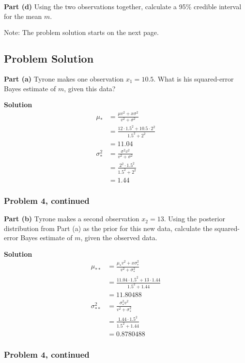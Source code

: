 \documentclass[12pt]{article}
\theoremstyle{definition}
\begin{document}
\bigskip
\noindent
{\bf Part (d)} Using the two observations together, calculate a 95\% credible interval for the mean $m$.

\bigskip
\noindent
Note: The problem solution starts on the next page.

\newpage
\subsection*{Problem Solution}

\noindent
{\bf Part (a)} Tyrone makes one observation $x_1 = 10.5$. What is his squared-error Bayes estimate of $m$, given this data?

\bigskip
\noindent
{\bf Solution} 
\begin{align*}
\mu_* &= \frac{\mu v^2 + x\sigma^2}{v^2 + \sigma^2}\\
&= \frac{12 \cdot 1.5^2 + 10.5 \cdot 2^2}{1.5^2 + 2^2}\\
&= 11.04\\
\sigma^2_* &= \frac{\sigma^2 v^2}{v^2 + \sigma^2}\\
&= \frac{2^2 \cdot 1.5^2}{1.5^2 + 2^2}\\
&= 1.44
\end{align*}


\newpage
\subsubsection*{Problem 4, continued}

\noindent
{\bf Part (b)} Tyrone makes a second observation $x_2 = 13$. Using the posterior distribution from Part (a) as the prior for this new data, calculate the squared-error Bayes estimate of $m$, given the observed data.

\bigskip
\noindent
{\bf Solution} 
\begin{align*}
\mu_{**} &= \frac{\mu_* v^2 + x\sigma^2_*}{v^2 + \sigma^2_*}\\
&= \frac{11.04 \cdot 1.5^2 + 13 \cdot 1.44}{1.5^2 + 1.44}\\
&= 11.80488\\
\sigma^2_{**} &= \frac{\sigma^2_* v^2}{v^2 + \sigma^2_*}\\
&= \frac{1.44 \cdot 1.5^2}{1.5^2 + 1.44}\\
&= 0.8780488
\end{align*}



\newpage
\subsubsection*{Problem 4, continued}
\end{document}
